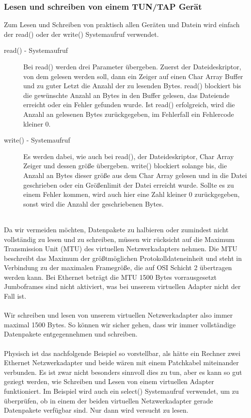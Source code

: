 \subsubsection{Lesen und schreiben von einem TUN/TAP Gerät}
Zum Lesen und Schreiben von praktisch allen Geräten und Datein wird einfach der read() oder der write() Systemaufruf verwendet. 
\\
\begin{description}
    \item[read() - Systemaufruf] Bei read() werden drei Parameter übergeben. Zuerst der Dateideskriptor, von dem gelesen werden soll, dann ein Zeiger auf einen Char Array Buffer und zu guter Letzt die Anzahl der zu lesenden Bytes. read() blockiert bis die gewünschte Anzahl an Bytes in den Buffer gelesen, das Dateiende erreicht oder ein Fehler gefunden wurde. Ist read() erfolgreich, wird die Anzahl an gelesenen Bytes zurückgegeben, im Fehlerfall ein Fehlercode kleiner 0.
    \\%
    \item[write() - Systemaufruf] Es werden dabei, wie auch bei read(), der Dateideskriptor, Char Array Zeiger und dessen größe übergeben. write() blockiert solange bis, die Anzahl an Bytes dieser größe aus dem Char Array gelesen und in die Datei geschrieben oder ein Größenlimit der Datei erreicht wurde. Sollte es zu einem Fehler kommen, wird auch hier eine Zahl kleiner 0 zurückgegeben, sonst wird die Anzahl der geschriebenen Bytes.
\end{description}
\ \\
Da wir vermeiden möchten, Datenpakete zu halbieren oder zumindest nicht vollständig zu lesen und zu schreiben, müssen wir rücksicht auf die Maximum Transmission Unit (MTU) des virtuellen Netzwerkadapters nehmen. Die MTU beschreibt das Maximum der größtmöglichen Protokolldateneinheit und steht in Verbindung zu der maximalen Framegröße, die auf OSI Schicht 2 übertragen werden kann. Bei Ethernet beträgt die MTU 1500 Bytes vorrausgesetzt Jumboframes sind nicht aktiviert, was bei unserem virtuellen Adapter nicht der Fall ist.
\\\\
Wir schreiben und lesen von unserem virtuellen Netzwerkadapter also immer maximal 1500 Bytes. So können wir sicher gehen, dass wir immer vollständige Datenpakete entgegennehmen und schreiben.
\\\\
Physisch ist das nachfolgende Beispiel so vorstellbar, als hätte ein Rechner zwei Ethernet Netzwerkadapter und beide wären mit einem Patchkabel miteinander verbunden. Es ist zwar nicht besonders sinnvoll dies zu tun, aber es kann so gut geziegt werden, wie Schreiben und Lesen von einem virtuellen Adapter funktioniert. Im Beispiel wird auch ein select() Systemaufruf verwendet, um zu überprüfen, ob in einem der beiden virtuellen Netzwerkadapter gerade Datenpakete verfügbar sind. Nur dann wird versucht zu lesen. 
